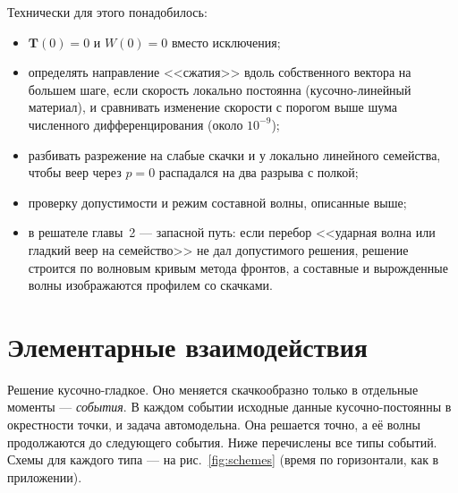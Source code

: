 \documentclass[11pt,a4paper]{article}
\theoremstyle{definition}
\theoremstyle{remark}
\newcommand{\bT}{\mathbf T}
\begin{document}
Технически для этого понадобилось:
\begin{itemize}
\item $\bT(0)=0$ и $W(0)=0$ вместо исключения;
\item определять направление <<сжатия>> вдоль собственного вектора на большем шаге, если скорость
локально постоянна (кусочно-линейный материал), и сравнивать изменение скорости с порогом выше
шума численного дифференцирования (около $10^{-9}$);
\item разбивать разрежение на слабые скачки и у локально линейного семейства, чтобы веер через
$p=0$ распадался на два разрыва с полкой;
\item проверку допустимости и режим составной волны, описанные выше;
\item в решателе главы~2 --- запасной путь: если перебор <<ударная волна или гладкий веер на
семейство>> не дал допустимого решения, решение строится по волновым кривым метода фронтов, а
составные и вырожденные волны изображаются профилем со скачками.
\end{itemize}

\section{Элементарные взаимодействия}\label{sec:events}

Решение кусочно-гладкое. Оно меняется скачкообразно только в отдельные моменты --- \emph{события}.
В каждом событии исходные данные кусочно-постоянны в окрестности точки, и задача автомодельна.
Она решается точно, а её волны продолжаются до следующего события. Ниже перечислены все типы
событий. Схемы для каждого типа --- на рис.~\ref{fig:schemes} (время по горизонтали, как в
приложении).
\end{document}
